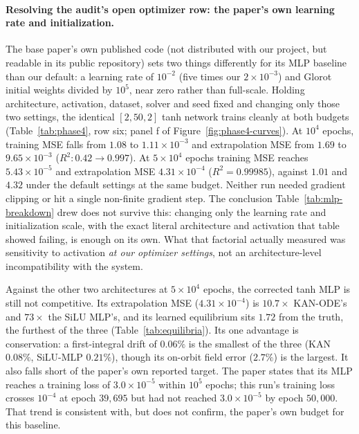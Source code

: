 \paragraph{Resolving the audit's open optimizer row: the paper's own learning
rate and initialization.} The base paper's own published code (not
distributed with our project, but readable in its public repository) sets
two things differently for its MLP baseline than our default: a learning
rate of $10^{-2}$ (five times our $2\times10^{-3}$) and Glorot initial
weights divided by $10^5$, near zero rather than full-scale. Holding
architecture, activation, dataset, solver and seed fixed and changing only
those two settings, the identical $[2,50,2]$ tanh network trains cleanly at
both budgets (Table~\ref{tab:phase4}, row six; panel f of
Figure~\ref{fig:phase4-curves}). At $10^4$ epochs, training MSE falls from
$1.08$ to $1.11\times10^{-3}$ and extrapolation MSE from $1.69$ to
$9.65\times10^{-3}$ ($R^2:0.42\to0.997$). At $5\times10^4$ epochs training
MSE reaches $5.43\times10^{-5}$ and extrapolation MSE $4.31\times10^{-4}$
($R^2=0.99985$), against $1.01$ and $4.32$ under the default settings at the
same budget. Neither run needed gradient clipping or hit a single
non-finite gradient step. The conclusion Table~\ref{tab:mlp-breakdown} drew
does not survive this: changing only the learning rate and initialization
scale, with the exact literal architecture and activation that table showed
failing, is enough on its own. What that factorial actually measured was
sensitivity to activation \emph{at our optimizer settings}, not an
architecture-level incompatibility with the system.

Against the other two architectures at $5\times10^4$ epochs, the corrected
tanh MLP is still not competitive. Its extrapolation MSE
($4.31\times10^{-4}$) is $10.7\times$ KAN-ODE's and $73\times$ the SiLU MLP's,
and its learned equilibrium sits $1.72$ from the truth, the furthest of the
three (Table~\ref{tab:equilibria}). Its one advantage is conservation: a
first-integral drift of $0.06\%$ is the smallest of the three (KAN $0.08\%$,
SiLU-MLP $0.21\%$), though its on-orbit field error ($2.7\%$) is the
largest. It also falls short of the paper's own reported target. The paper
states that its MLP reaches a training loss of $3.0\times10^{-5}$ within
$10^5$ epochs; this run's training loss crosses $10^{-4}$ at epoch
$39{,}695$ but had not reached $3.0\times10^{-5}$ by epoch $50{,}000$. That
trend is consistent with, but does not confirm, the paper's own budget for
this baseline.

